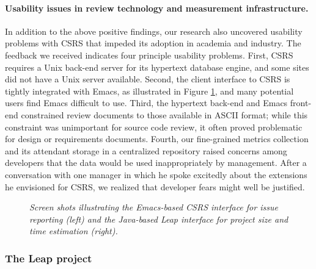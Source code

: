 \vspace*{-.15in} \paragraph{Usability issues in review technology and measurement infrastructure.}
 In addition to the above positive findings, our research also
  uncovered usability problems with CSRS that
  impeded its adoption in academia and industry.  The feedback we received
  indicates four principle usability problems.  First, CSRS requires a Unix
  back-end server for its hypertext database engine, and some sites did not
  have a Unix server available.  Second, the client interface to CSRS is
  tightly integrated with Emacs, as illustrated in Figure
  \ref{fig:csrsleap}, and many potential users find Emacs
  difficult to use.  Third, the hypertext back-end and Emacs front-end
  constrained review documents to those available in ASCII format; while
  this constraint was unimportant for source code review, it often proved
  problematic for design or requirements documents. Fourth, our
  fine-grained metrics collection and its attendant storage in a
  centralized repository raised concerns among developers that the data
  would be used inappropriately by management.  After a conversation with
  one manager in which he spoke excitedly about the extensions he
  envisioned for CSRS, we realized that developer fears might well be
  justified.


\begin{figure}[t]
 {\centerline {}}
 \caption{{\em Screen shots illustrating the Emacs-based CSRS interface 
for issue reporting (left) and the Java-based Leap interface for 
project size and time estimation (right).}}
 \label{fig:csrsleap}
\end{figure}

\subsubsection{The Leap project}


